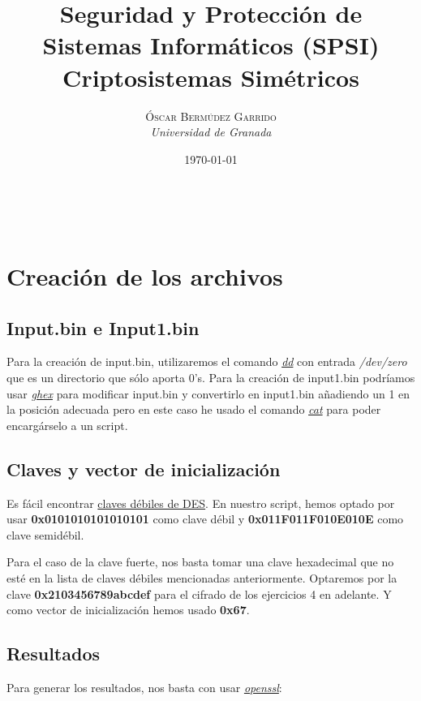 \documentclass[a4paper, 11pt]{article}
\title{\textbf{Seguridad y Protección de Sistemas Informáticos (SPSI)}\\ %
Criptosistemas Simétricos} %
\author{\textsc{Óscar Bermúdez Garrido} %
\\{\textit{Universidad de Granada}}} %
\date{\today} %
\makeatletter
\renewcommand{\maketitle}{
  \begin{flushright} %
  
  {\LARGE\@title} %
  
  \vspace{50pt} %
  
  {\large\@author} %
  \\\@date %
  \vspace{40pt} %
  \end{flushright}
}
\makeatother
\begin{document}
\maketitle %

\renewcommand{\abstractname}{Resumen} %

{\parskip=2pt
  \tableofcontents
}
\pagebreak


\section{Creación de los archivos}
	\subsection{Input.bin e Input1.bin}
		Para la creación de input.bin, utilizaremos el comando \href{http://manpages.ubuntu.com/manpages/zesty/en/man1/dd.1.html}
		{\textit{dd}} con entrada \textit{/dev/zero} que es un directorio que sólo aporta 0's. Para la creación de input1.bin
		podríamos usar \href{http://manpages.ubuntu.com/manpages/zesty/en/man1/ghex.1.html}{\textit{ghex}} para modificar
		input.bin y convertirlo en input1.bin añadiendo un 1 en la posición adecuada pero en este caso he usado el comando
		\href{http://manpages.ubuntu.com/manpages/zesty/en/man1/cat.1.html}{\textit{cat}} para poder encargárselo a un script.
		
	\subsection{Claves y vector de inicialización}
		Es fácil encontrar \href{https://en.wikipedia.org/wiki/Weak_key#Weak_keys_in_DES}{claves débiles de DES}. En nuestro
		script, hemos optado por usar \textbf{0x0101010101010101} como clave débil y \textbf{0x011F011F010E010E} como clave
		semidébil.
		
		Para el caso de la clave fuerte, nos basta tomar una clave hexadecimal que no esté en la lista de claves débiles
		mencionadas anteriormente. Optaremos por la clave \textbf{0x2103456789abcdef} %
		para el cifrado de los ejercicios 4 en adelante. Y como vector de inicialización hemos usado \textbf{0x67}. %

	\subsection{Resultados}
		Para generar los resultados, nos basta con usar \href{http://manpages.ubuntu.com/manpages/zesty/en/man1/openssl.1ssl.html}
		{\textit{openssl}}:
		
\end{document}
